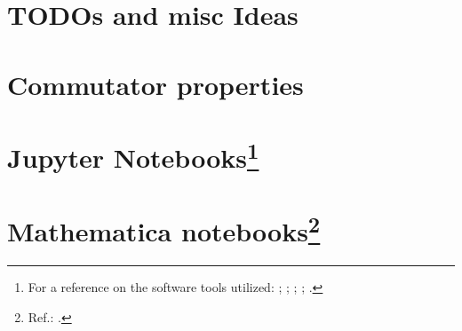 \chapter{TODOs and misc Ideas}

%

\appendix

\chapter{Commutator properties}


\chapter[Jupyter Notebooks]{Jupyter Notebooks\footnote{
  For a reference on the software tools utilized:
  \cite{comp:scipy};
  \cite{comp:sympy};
  \cite{comp:jupyter};
  \cite{comp:matplotlib};
  \cite{comp:numpy}.
}}



%


\chapter[Mathematica notebooks]{Mathematica notebooks\footnote{
  Ref.: \cite{Wolfram}.
}}



\printbibliography[heading=bibintoc]


